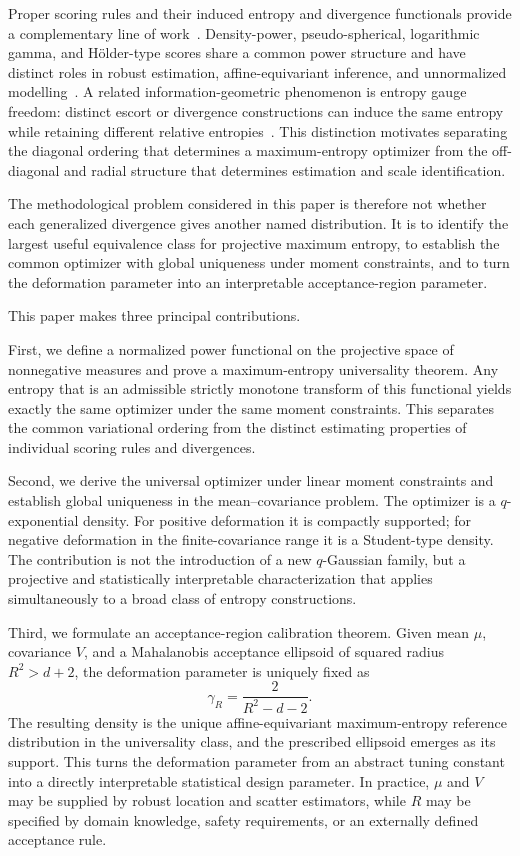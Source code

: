 \documentclass[pdflatex,sn-mathphys-num]{sn-jnl}
\theoremstyle{thmstyleone}
\theoremstyle{thmstyletwo}
\theoremstyle{thmstylethree}
\begin{document}
Proper scoring rules and their induced entropy and divergence functionals provide a complementary line of work~\citep{GneitingRaftery2007,Ovcharov2018}. Density-power, pseudo-spherical, logarithmic gamma, and H\"older-type scores share a common power structure and have distinct roles in robust estimation, affine-equivariant inference, and unnormalized modelling~\citep{BasuHarrisHjortJones1998,FujisawaEguchi2008,KanamoriFujisawa2014Bernoulli,Kanamori2014Entropy,HinoEguchi2023}. A related information-geometric phenomenon is entropy gauge freedom: distinct escort or divergence constructions can induce the same entropy while retaining different relative entropies~\citep{MatsuzoeTakatsu2021}. This distinction motivates separating the diagonal ordering that determines a maximum-entropy optimizer from the off-diagonal and radial structure that determines estimation and scale identification.

The methodological problem considered in this paper is therefore not whether each generalized divergence gives another named distribution. It is to identify the largest useful equivalence class for projective maximum entropy, to establish the common optimizer with global uniqueness under moment constraints, and to turn the deformation parameter into an interpretable acceptance-region parameter.

This paper makes three principal contributions.

First, we define a normalized power functional on the projective space of nonnegative measures and prove a maximum-entropy universality theorem. Any entropy that is an admissible strictly monotone transform of this functional yields exactly the same optimizer under the same moment constraints. This separates the common variational ordering from the distinct estimating properties of individual scoring rules and divergences.

Second, we derive the universal optimizer under linear moment constraints and establish global uniqueness in the mean--covariance problem. The optimizer is a $q$-exponential density. For positive deformation it is compactly supported; for negative deformation in the finite-covariance range it is a Student-type density. The contribution is not the introduction of a new $q$-Gaussian family, but a projective and statistically interpretable characterization that applies simultaneously to a broad class of entropy constructions.

Third, we formulate an acceptance-region calibration theorem. Given mean $\mu$, covariance $V$, and a Mahalanobis acceptance ellipsoid of squared radius $R^2>d+2$, the deformation parameter is uniquely fixed as
\[
 \gamma_R=\frac{2}{R^2-d-2}.
\]
The resulting density is the unique affine-equivariant maximum-entropy reference distribution in the universality class, and the prescribed ellipsoid emerges as its support. This turns the deformation parameter from an abstract tuning constant into a directly interpretable statistical design parameter. In practice, $\mu$ and $V$ may be supplied by robust location and scatter estimators, while $R$ may be specified by domain knowledge, safety requirements, or an externally defined acceptance rule.
\end{document}
